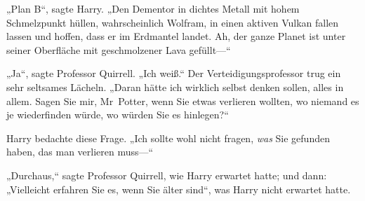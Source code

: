 „Plan B“, sagte Harry. „Den Dementor in dichtes Metall mit hohem Schmelzpunkt hüllen, wahrscheinlich Wolfram, in einen aktiven Vulkan fallen lassen und hoffen, dass er im Erdmantel landet. Ah, der ganze Planet ist unter seiner Oberfläche mit geschmolzener Lava gefüllt—“

„Ja“, sagte Professor Quirrell. „Ich weiß.“ Der Verteidigungsprofessor trug ein sehr seltsames Lächeln. „Daran hätte ich wirklich selbst denken sollen, alles in allem. Sagen Sie mir, Mr~Potter, wenn Sie etwas verlieren wollten, wo niemand es je wiederfinden würde, wo würden Sie es hinlegen?“

Harry bedachte diese Frage. „Ich sollte wohl nicht fragen, \emph{was} Sie gefunden haben, das man verlieren muss—“

„Durchaus,“ sagte Professor Quirrell, wie Harry erwartet hatte; und dann: „Vielleicht erfahren Sie es, wenn Sie älter sind“, was Harry nicht erwartet hatte.

